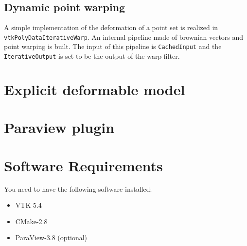 \documentclass{InsightArticle}
\begin{document}
\subsection{Dynamic point warping}
%
A simple implementation of the deformation of a point set is realized in
\verb!vtkPolyDataIterativeWarp!. An internal pipeline made of brownian vectors
and point warping is built. The input of this pipeline is \verb!CachedInput!
and the \verb!IterativeOutput! is set to be the output of the warp filter.
%
\section{Explicit deformable model}

\section{Paraview plugin}


\section{Software Requirements}

You need to have the following software installed:

\begin{itemize}
  \item  VTK-5.4
  \item  CMake-2.8
  \item  ParaView-3.8 (optional)
\end{itemize}

\appendix

%
%



\end{document}
